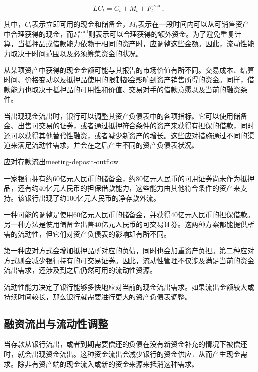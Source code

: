 \begin{equation}
LC_t=C_t+M_t+F_t^{\mathrm{avail}},
\label{eq:ch12-liquidity-capacity}
\end{equation}

其中，$C_t$表示立即可用的现金和储备金，$M_t$表示在一段时间内可以从可销售资产中合理获得的现金，而$F_t^{\mathrm{avail}}$则表示可以合理获得的额外资金。为了避免重复计算，当抵押品或借款能力依赖于相同的资产时，应调整这些金额。因此，流动性能力取决于时间范围以及必须筹集资金的状况。

从某项资产中获得的现金金额可能与其报告的市场价值有所不同。交易成本、结算时间、价格变动以及抵押品使用的限制都会影响到资产销售所得的资金。同样，借款能力也取决于抵押品的可用性和价值、交易对手的借款意愿以及当前的融资条件。

当出现现金流出时，银行可以调整其资产负债表中的各项指标。它可以使用储备金、出售可交易的证券，或者通过抵押符合条件的资产来获得有担保的借款，同时还可以获得其他替代性融资，或者减少新资产的增长。这些应对措施通过不同的渠道来满足流动性需求，并会在之后产生不同的资产负债表状况。

\begin{example}{应对存款流出}{meeting-deposit-outflow}

一家银行拥有约60亿元人民币的储备金，约80亿元人民币的可用证券尚未作为抵押品，还有约40亿元人民币的担保借款能力，这些能力由其他符合条件的资产来支持。该银行出现了约100亿元人民币的净存款外流。

一种可能的调整是使用60亿元人民币的储备金，并获得40亿元人民币的担保借款。另一种方法是使用储备金出售40亿元人民币的可交易证券。这两种方案都能提供所需的流动性，但它们对资产负债表的影响却有所不同。

第一种应对方式会增加抵押品所对应的负债，同时也会加重资产负担。第二种应对方式则会减少银行持有的可交易证券。因此，流动性管理不仅涉及满足当前的资金流出需求，还涉及到之后仍然可用的流动性资源。

\end{example}

流动性能力决定了银行能够多快地应对当前的现金流出需求。如果流出金额较大或持续时间较长，那么银行就需要进行更大的资产负债表调整。

\subsection{融资流出与流动性调整}

当存款从银行流出，或者到期需要偿还的负债在没有新资金补充的情况下被偿还时，就会出现资金流出。这种资金流出会减少银行的资金供应，从而产生现金需求。除非有资产端的现金流入或新的资金来源来抵消这种需求。

